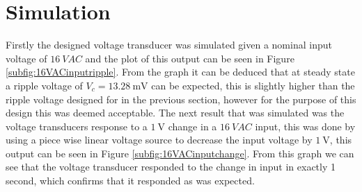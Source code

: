 \section{Simulation} \label{sec:simulation_voltage_peak_transducer}
Firstly the designed voltage transducer was simulated given a nominal input voltage of $\SI{16}{VAC}$ and the plot of this output can be seen in Figure \ref{subfig:16VACinputripple}. From the graph it can be deduced that at steady state a ripple voltage of $V_{c}=\SI{13.28}{\milli \volt}$ can be expected, this is slightly higher than the ripple voltage designed for in the previous section, however for the purpose of this design this was deemed acceptable. The next result that was simulated was the voltage transducers response to a $\SI{1}{\volt}$ change in a $\SI{16}{VAC}$ input, this was done by using a piece wise linear voltage source to decrease the input voltage by $\SI{1}{\volt}$, this output can be seen in Figure \ref{subfig:16VACinputchange}. From this graph we can see that the voltage transducer responded to the change in input in exactly 1 second, which confirms that it responded as was expected.

